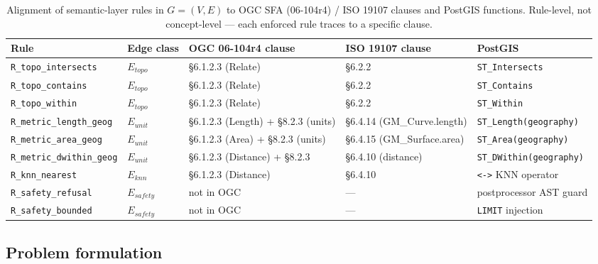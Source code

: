 \documentclass[11pt]{article}
\begin{document}
\begin{table}[t]
\centering\footnotesize
\caption{Alignment of semantic-layer rules in $G=(V,E)$ to OGC SFA
(06-104r4) / ISO 19107 clauses and PostGIS functions. Rule-level, not
concept-level --- each enforced rule traces to a specific clause.}
\label{tab:alignment}
\begin{tabular}{@{}llllp{3.0cm}@{}}
\toprule
Rule & Edge class & OGC 06-104r4 clause & ISO 19107 clause & PostGIS \\
\midrule
\texttt{R\_topo\_intersects} & $E_{topo}$ & \S 6.1.2.3 (Relate)   & \S 6.2.2 & \texttt{ST\_Intersects} \\
\texttt{R\_topo\_contains}   & $E_{topo}$ & \S 6.1.2.3 (Relate)   & \S 6.2.2 & \texttt{ST\_Contains} \\
\texttt{R\_topo\_within}     & $E_{topo}$ & \S 6.1.2.3 (Relate)   & \S 6.2.2 & \texttt{ST\_Within} \\
\texttt{R\_metric\_length\_geog}   & $E_{unit}$ & \S 6.1.2.3 (Length) + \S 8.2.3 (units) & \S 6.4.14 (GM\_Curve.length) & \texttt{ST\_Length(geography)} \\
\texttt{R\_metric\_area\_geog}     & $E_{unit}$ & \S 6.1.2.3 (Area) + \S 8.2.3 (units)   & \S 6.4.15 (GM\_Surface.area) & \texttt{ST\_Area(geography)} \\
\texttt{R\_metric\_dwithin\_geog}  & $E_{unit}$ & \S 6.1.2.3 (Distance) + \S 8.2.3 & \S 6.4.10 (distance)       & \texttt{ST\_DWithin(geography)} \\
\texttt{R\_knn\_nearest}     & $E_{knn}$  & \S 6.1.2.3 (Distance) & \S 6.4.10 & \texttt{<->} KNN operator \\
\texttt{R\_safety\_refusal}  & $E_{safety}$ & not in OGC & --- & postprocessor AST guard \\
\texttt{R\_safety\_bounded}  & $E_{safety}$ & not in OGC & --- & \texttt{LIMIT} injection \\
\bottomrule
\end{tabular}
\end{table}

\subsection{Problem formulation}
\end{document}
